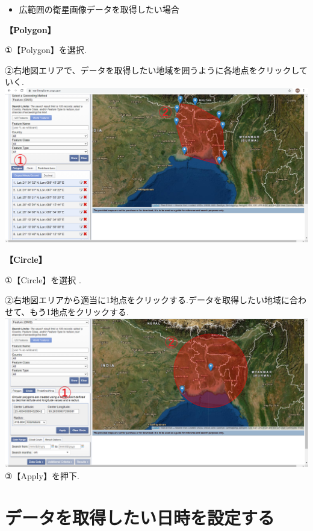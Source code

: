 \documentclass[
]{book}
\providecommand{\tightlist}{%
  \setlength{\itemsep}{0pt}\setlength{\parskip}{0pt}}
\begin{document}
\begin{itemize}
\tightlist
\item
  広範囲の衛星画像データを取得したい場合
\end{itemize}

\textbf{【Polygon】}　　

①【Polygon】を選択.

②右地図エリアで、データを取得したい地域を囲うように各地点をクリックしていく.\\
\includegraphics{images/polygon.png}

\textbf{【Circle】}

①【Circle】を選択 .

②右地図エリアから適当に1地点をクリックする.データを取得したい地域に合わせて、もう1地点をクリックする.\\
\includegraphics{images/circle1.png}
③【Apply】を押下.

\hypertarget{ux30c7ux30fcux30bfux3092ux53d6ux5f97ux3057ux305fux3044ux65e5ux6642ux3092ux8a2dux5b9aux3059ux308b}{%
\section{データを取得したい日時を設定する}\label{ux30c7ux30fcux30bfux3092ux53d6ux5f97ux3057ux305fux3044ux65e5ux6642ux3092ux8a2dux5b9aux3059ux308b}}
\end{document}
